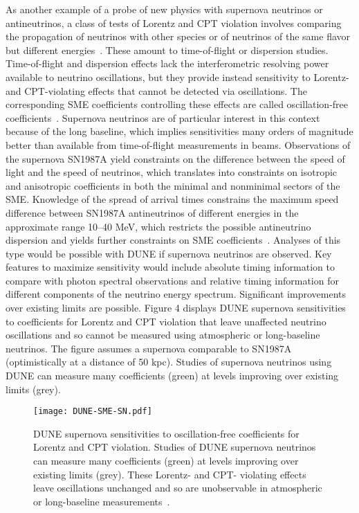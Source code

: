 As another example of a probe of new physics with supernova neutrinos or antineutrinos,
a class of tests of Lorentz and CPT violation involves comparing the propagation of neutrinos with other species or of neutrinos of the same flavor but different energies~\cite{Kostelecky:2003cr,Kostelecky:2003xn,Kostelecky:2011gq,Diaz:2009qk}. These amount to time-of-flight or dispersion studies.
Time-of-flight and dispersion effects lack the interferometric resolving power available to neutrino oscillations, but they provide instead sensitivity to Lorentz- and CPT-violating effects that cannot be detected via oscillations. The corresponding SME coefficients controlling these effects are called oscillation-free coefficients~\cite{Kostelecky:2011gq}.
Supernova neutrinos are of particular interest in this context because of the long baseline, which implies sensitivities many orders of magnitude better than available from time-of-flight measurements in beams. Observations of the supernova SN1987A yield constraints on the difference between the speed of light and the speed of neutrinos, which translates into constraints on isotropic and anisotropic coefficients in both the minimal and nonminimal sectors of the SME. Knowledge of the spread of arrival times constrains the maximum speed difference between SN1987A antineutrinos of different energies in the approximate range 10--40 MeV, which restricts the possible antineutrino dispersion and yields further constraints on SME coefficients~\cite{Kostelecky:2011gq}.
Analyses of this type would be possible with DUNE if supernova neutrinos are observed. Key features to maximize sensitivity would include absolute timing information to compare with photon spectral observations and relative timing information for different components of the neutrino energy spectrum. Significant improvements over existing limits are possible.
Figure 4 displays DUNE supernova sensitivities to coefficients for Lorentz and CPT violation that leave unaffected neutrino oscillations and so cannot be measured using atmospheric or long-baseline neutrinos. The figure assumes a supernova comparable to SN1987A (optimistically at a distance of 50 kpc). Studies of supernova neutrinos using DUNE can measure many coefficients (green) at levels improving over existing limits (grey).

\begin{figure}[!htb]
\centering
\texttt{[image: DUNE-SME-SN.pdf]}
\caption{DUNE supernova sensitivities to oscillation-free coefficients for Lorentz and CPT violation. Studies of DUNE supernova neutrinos can measure many coefficients (green) at levels improving over existing limits (grey). These Lorentz- and CPT- violating effects leave oscillations unchanged and so are unobservable in atmospheric or long-baseline measurements~\cite{kostelecky}.}
\label{fig:snliv}
\end{figure}

